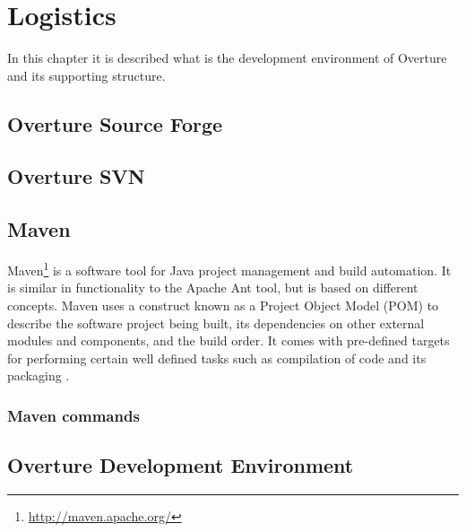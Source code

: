 \chapter{Logistics}

In this chapter it is described what is the development environment of Overture and its supporting structure.

\section{Overture Source Forge}




\section{Overture SVN}



\section{Maven}
Maven\footnote{\url{http://maven.apache.org/}} is a software tool for Java project management and build automation. It is similar in functionality to the Apache Ant tool, but is based on different concepts. Maven uses a construct known as a Project Object Model (POM) to describe the software project being built, its dependencies on other external modules and components, and the build order. It comes with pre-defined targets for performing certain well defined tasks such as compilation of code and its packaging \cite{Wikipedia}.

\subsection{Maven commands}


\section{Overture Development Environment}
